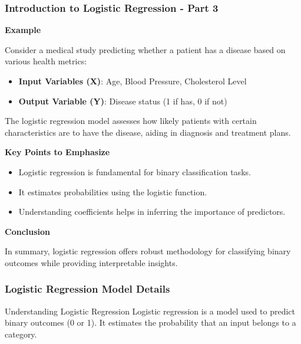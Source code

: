 \documentclass[aspectratio=169]{beamer}
\begin{document}
\begin{frame}[fragile]
    \frametitle{Introduction to Logistic Regression - Part 3}
    \textbf{Example}

    Consider a medical study predicting whether a patient has a disease based on various health metrics:

    \begin{itemize}
        \item \textbf{Input Variables (X)}: Age, Blood Pressure, Cholesterol Level
        \item \textbf{Output Variable (Y)}: Disease status (1 if has, 0 if not)
    \end{itemize}

    The logistic regression model assesses how likely patients with certain characteristics are to have the disease, aiding in diagnosis and treatment plans.

    \textbf{Key Points to Emphasize}
    
    \begin{itemize}
        \item Logistic regression is fundamental for binary classification tasks.
        \item It estimates probabilities using the logistic function.
        \item Understanding coefficients helps in inferring the importance of predictors.
    \end{itemize}

    \textbf{Conclusion}

    In summary, logistic regression offers robust methodology for classifying binary outcomes while providing interpretable insights.
\end{frame}

\begin{frame}[fragile]
    \frametitle{Logistic Regression Model Details}
    \begin{block}{Understanding Logistic Regression}
        Logistic regression is a model used to predict binary outcomes (0 or 1). 
        It estimates the probability that an input belongs to a category.
    \end{block}
\end{frame}
\end{document}
